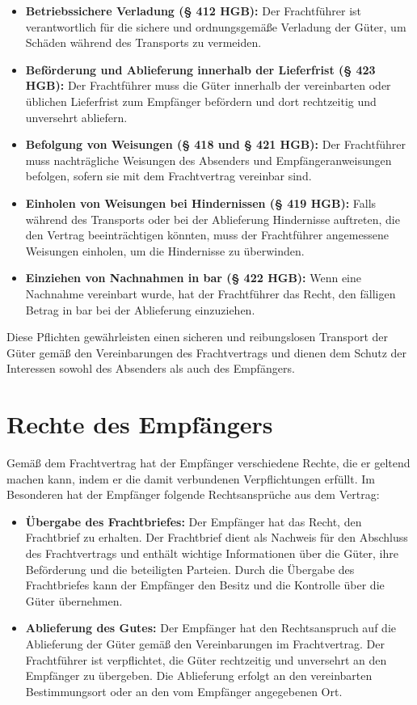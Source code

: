 \begin{itemize}
    \item \textbf{Betriebssichere Verladung (§ 412 HGB):} Der Frachtführer ist verantwortlich für die sichere und ordnungsgemäße Verladung der Güter, um Schäden während des Transports zu vermeiden.
    \item \textbf{Beförderung und Ablieferung innerhalb der Lieferfrist (§ 423 HGB):} Der Frachtführer muss die Güter innerhalb der vereinbarten oder üblichen Lieferfrist zum Empfänger befördern und dort rechtzeitig und unversehrt abliefern.
    \item \textbf{Befolgung von Weisungen (§ 418 und § 421 HGB):} Der Frachtführer muss nachträgliche Weisungen des Absenders und Empfängeranweisungen befolgen, sofern sie mit dem Frachtvertrag vereinbar sind.
    \item \textbf{Einholen von Weisungen bei Hindernissen (§ 419 HGB):} Falls während des Transports oder bei der Ablieferung Hindernisse auftreten, die den Vertrag beeinträchtigen könnten, muss der Frachtführer angemessene Weisungen einholen, um die Hindernisse zu überwinden.
    \item \textbf{Einziehen von Nachnahmen in bar (§ 422 HGB):} Wenn eine Nachnahme vereinbart wurde, hat der Frachtführer das Recht, den fälligen Betrag in bar bei der Ablieferung einzuziehen.
\end{itemize}

Diese Pflichten gewährleisten einen sicheren und reibungslosen Transport der Güter gemäß den Vereinbarungen des Frachtvertrags und dienen dem Schutz der Interessen sowohl des Absenders als auch des Empfängers.

\section{Rechte des Empfängers}

Gemäß dem Frachtvertrag hat der Empfänger verschiedene Rechte, die er geltend machen kann, indem er die damit verbundenen Verpflichtungen erfüllt. Im Besonderen hat der Empfänger folgende Rechtsansprüche aus dem Vertrag:

\begin{itemize}
    \item \textbf{Übergabe des Frachtbriefes:} Der Empfänger hat das Recht, den Frachtbrief zu erhalten. Der Frachtbrief dient als Nachweis für den Abschluss des Frachtvertrags und enthält wichtige Informationen über die Güter, ihre Beförderung und die beteiligten Parteien. Durch die Übergabe des Frachtbriefes kann der Empfänger den Besitz und die Kontrolle über die Güter übernehmen.
    \item \textbf{Ablieferung des Gutes:} Der Empfänger hat den Rechtsanspruch auf die Ablieferung der Güter gemäß den Vereinbarungen im Frachtvertrag. Der Frachtführer ist verpflichtet, die Güter rechtzeitig und unversehrt an den Empfänger zu übergeben. Die Ablieferung erfolgt an den vereinbarten Bestimmungsort oder an den vom Empfänger angegebenen Ort.
\end{itemize}

